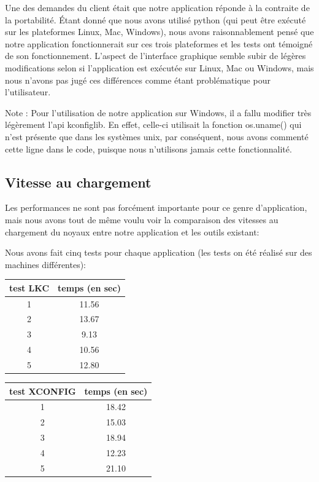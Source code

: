 \documentclass[16pts]{report}
\begin{document}
Une des demandes du client était que notre application réponde à la contraite
de la portabilité. Étant donné que nous avons utilisé python (qui peut être 
exécuté sur les plateformes Linux, Mac, Windows), nous avons raisonnablement
pensé que notre application fonctionnerait sur ces trois plateformes et les tests
ont témoigné de son fonctionnement. L'aspect de l'interface graphique semble
subir de légères modifications selon si l'application est exécutée sur Linux,
Mac ou Windows, mais nous n'avons pas jugé ces différences comme étant
problématique pour l'utilisateur.

Note : Pour l'utilisation de notre application sur Windows, il a fallu modifier
très légèrement l'api kconfiglib. En effet, celle-ci utilisait la fonction
os.uname() qui n'est présente que dans les systèmes unix, par conséquent, nous
avons commenté cette ligne dans le code, puisque nous n'utilisons jamais cette 
fonctionnalité.



\subsection{Vitesse au chargement}

Les performances ne sont pas forcément importante pour ce genre d'application,
mais nous avons tout de même voulu voir la comparaison des vitesses au 
chargement du noyaux entre notre application et les outils existant:

Nous avons fait cinq tests pour chaque application (les tests on été réalisé
sur des machines différentes):

\begin{tabular}{|c|c|}
\hline
test LKC & temps (en sec) \\
\hline
\hline
1 & 11.56 \\
\hline
2 & 13.67 \\
\hline
3 & 9.13 \\
\hline
4 & 10.56 \\
\hline
5 & 12.80 \\
\hline
\end{tabular}

\begin{tabular}{|c|c|}
\hline
test XCONFIG & temps (en sec) \\
\hline
\hline
1 & 18.42 \\
\hline
2 & 15.03 \\
\hline
3 & 18.94 \\
\hline
4 & 12.23 \\
\hline
5 & 21.10 \\
\hline
\end{tabular}
\end{document}
